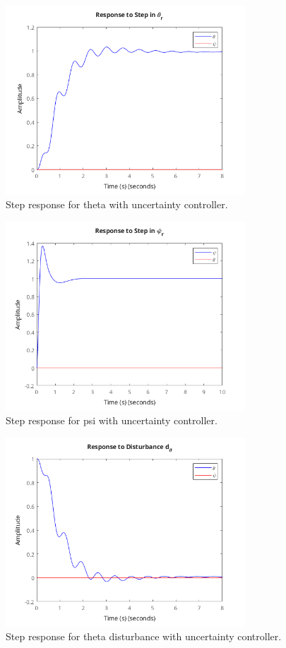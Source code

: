 \documentclass{article}
\begin{document}
\begin{figure}[H]
    \centering
    \includegraphics[width=0.8\textwidth]{stepThetaRP.png}
    \caption{Step response for theta with uncertainty controller.}
    \label{fig:stepThetaRP}
\end{figure}

\begin{figure}[H]
    \centering
    \includegraphics[width=0.8\textwidth]{stepPsiRP.png}
    \caption{Step response for psi with uncertainty controller.}
    \label{fig:stepPsiRP}
\end{figure}

\begin{figure}[H]
    \centering
    \includegraphics[width=0.8\textwidth]{stepDthetaRP.png}
    \caption{Step response for theta disturbance with uncertainty controller.}
    \label{fig:stepDthetaRP}
\end{figure}
\end{document}
